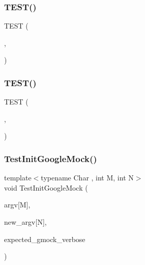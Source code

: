 \mbox{\label{googletest-master_2googlemock_2test_2gmock__test_8cc_a6d85c181697be8603091b049564cf5c6}} 
\subsubsection{\texorpdfstring{TEST()}{TEST()}\hspace{0.1cm}{\footnotesize\ttfamily [12/13]}}
{\footnotesize\ttfamily T\+E\+ST (\begin{DoxyParamCaption}\item[{Wide\+Init\+Google\+Mock\+Test}]{,  }\item[{Parses\+Google\+Mock\+Flag\+And\+Unrecognized\+Flag}]{ }\end{DoxyParamCaption})}

\mbox{\label{googletest-master_2googlemock_2test_2gmock__test_8cc_a737c00dcd21d5b1ef3d9299cab7a51d3}} 
\subsubsection{\texorpdfstring{TEST()}{TEST()}\hspace{0.1cm}{\footnotesize\ttfamily [13/13]}}
{\footnotesize\ttfamily T\+E\+ST (\begin{DoxyParamCaption}\item[{Flag\+Test}]{,  }\item[{Is\+Accessible\+In\+Code}]{ }\end{DoxyParamCaption})}

\mbox{\label{googletest-master_2googlemock_2test_2gmock__test_8cc_ac9c8ae8722c330d47f75dee43fb8ab78}} 
\subsubsection{\texorpdfstring{TestInitGoogleMock()}{TestInitGoogleMock()}}
{\footnotesize\ttfamily template$<$typename Char , int M, int N$>$ \\
void Test\+Init\+Google\+Mock (\begin{DoxyParamCaption}\item[{const Char $\ast$(\&)}]{argv\mbox{[}\+M\mbox{]},  }\item[{const Char $\ast$(\&)}]{new\+\_\+argv\mbox{[}\+N\mbox{]},  }\item[{const \+::std\+::string \&}]{expected\+\_\+gmock\+\_\+verbose }\end{DoxyParamCaption})}


